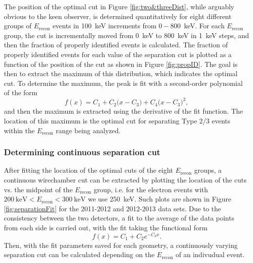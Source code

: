 The position of the optimal cut in Figure \ref{fig:two&threeDist}, while arguably obvious
to the keen observer, is determined quantitatively for eight different groups of $E_{\mathrm{recon}}$ events in
100~keV increments from $0-800$~keV. For each $E_{\mathrm{recon}}$ group,
the cut is incrementally moved from 0~keV to 800~keV in 1~keV steps, and then the fraction
of properly identified events is calculated. The fraction of properly identified events for
each value of the separation cut is plotted as a function of the position of the cut as shown
in Figure \ref{fig:propID}. The goal is then to extract the maximum of this distribution, which
indicates the optimal cut. To determine the maximum, the peak is fit with a second-order polynomial
of the form
%
\begin{equation}
  f(x) = C_1 + C_2\big(x-C_3\big) + C_4\big(x-C_3\big)^2,
\end{equation}
%
and then the maximum is extracted using the derivative of the fit function. The location
of this maximum is the optimal cut for separating Type 2/3 events within the $E_{\mathrm{recon}}$  
range being analyzed.



\subsubsection{Determining continuous separation cut}

After fitting the location of the optimal cuts of the eight $E_{\mathrm{recon}}$ groups, a
continuous wirechamber cut can be extracted by plotting the location of the cuts vs. the
midpoint of the $E_{\mathrm{recon}}$ group, i.e. for the electron events with
$200\mathrm{~keV}<E_{\mathrm{recon}}<300\mathrm{~keV}$ we use 250~keV. Such plots are shown in
Figure \ref{fig:separationFit} for the 2011-2012
and 2012-2013 data sets. Due to the consistency between the two detectors, a fit to the
average of the data points from each side is carried out, with the fit taking the
functional form 
%
\begin{equation}
  f(x) = C_1 + C_2e^{-C_3x}.
\end{equation}
Then, with the fit parameters saved for each geometry, a continuously varying separation
cut can be calculated depending on the $E_{\mathrm{recon}}$ of an indivudual event.

